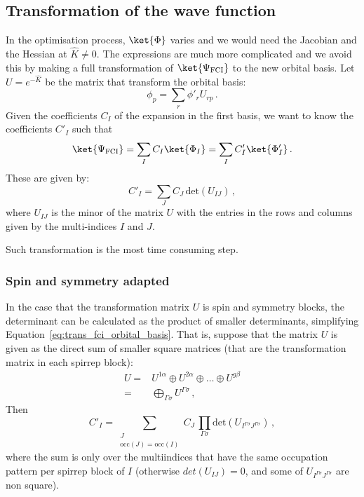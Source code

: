 \documentclass[a4paper,11pt]{article}
\newcommand{\irp}{\ensuremath{\Gamma}}
\begin{document}
\subsection{Transformation of the wave function}
In the optimisation process, $\ket{\Phi}$ varies and we would need the Jacobian and the Hessian at $\hat{K} \ne 0$.
The expressions are much more complicated and we avoid this by making a full transformation of $\ket{\Psi_\text{FCI}}$ to the new orbital basis.
Let $U = e^{-\hat{K}}$ be the matrix that transform the orbital basis:
\begin{equation}
  \phi_p = \sum_r \phi'_r U_{rp}\,.
\end{equation}
Given the coefficients $C_I$ of the expansion in the first basis, we want to know the coefficients $C'_I$ such that
\begin{equation}
  \ket{\Psi_\text{FCI}} = \sum_I C_I \ket{\Phi_I} = \sum_I C'_I \ket{\Phi'_I}\,.
\end{equation}
These are given by:
\begin{equation}\label{eq:trans_fci_orbital_basis}
  C'_I = \sum_J C_J\, \text{det}(U_{IJ})\,,
\end{equation}
where $U_{IJ}$ is the minor of the matrix $U$ with the entries in the rows and columns given by the multi-indices $I$ and $J$.

Such transformation is the most time consuming step.

\subsubsection{Spin and symmetry adapted}

In the case that the transformation matrix $U$ is spin and symmetry blocks, the determinant can be calculated as the product of smaller determinants, simplifying Equation~\eqref{eq:trans_fci_orbital_basis}.
That is, suppose that the matrix $U$ is given as the direct sum of smaller square matrices (that are the transformation matrix in each spirrep block):
\begin{equation}
  \begin{split}
    U =& U^{1\alpha} \oplus U^{2\alpha} \oplus \dots \oplus U^{g\beta}\\
    =& \bigoplus_{\irp \sigma} U^{\irp\sigma}\,,
  \end{split}
\end{equation}
Then 
\begin{equation}\label{eq:trans_fci_orbital_basis_sym}
  C'_I = \sum_{\substack{J\\\text{occ}(J) = \text{occ}(I)}}
  C_J\, \prod_{\irp\sigma} \text{det}(U_{I^{\irp\sigma}J^{\irp\sigma}})\,,
\end{equation}
where the sum is only over the multiindices that have the same occupation pattern per spirrep block of $I$ (otherwise $det(U_{IJ}) = 0$, and some of $U_{I^{\irp\sigma}J^{\irp\sigma}}$ are non square).
\end{document}

